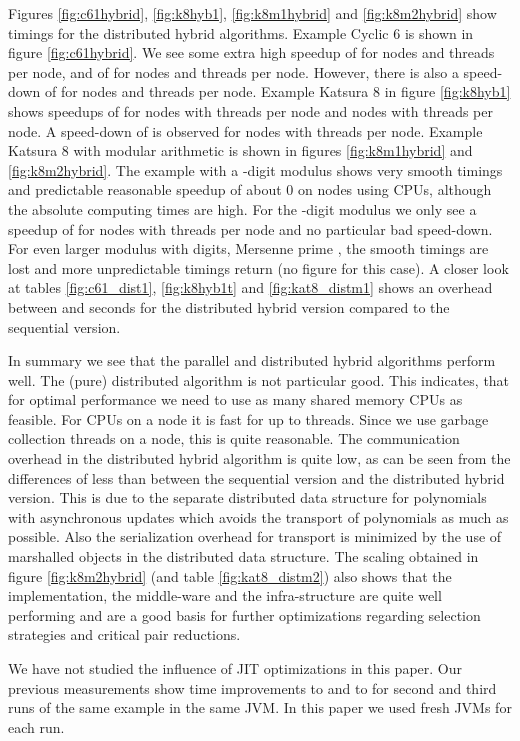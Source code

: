 \documentclass[10pt,twocolumn,a4paper]{article}
\begin{document}
Figures \ref{fig:c61hybrid}, \ref{fig:k8hyb1}, \ref{fig:k8m1hybrid}
and \ref{fig:k8m2hybrid} show timings for the distributed hybrid
algorithms.  Example Cyclic 6 is shown in figure \ref{fig:c61hybrid}.
We see some extra high speedup of  for  nodes and  threads
per node, and of  for  nodes and  threads per node. However,
there is also a speed-down of  for  nodes and  threads per
node.  Example Katsura 8 in figure \ref{fig:k8hyb1} shows speedups of
 for  nodes with  threads per node and  nodes with 
threads per node.  A speed-down of  is observed for  nodes
with  threads per node.  Example Katsura 8 with modular arithmetic
is shown in figures \ref{fig:k8m1hybrid} and \ref{fig:k8m2hybrid}.
The example with a -digit modulus shows very smooth timings and
predictable reasonable speedup of about 0 on  nodes using 
CPUs, although the absolute computing times are high.  For the
-digit modulus we only see a speedup of  for  nodes with 
threads per node and no particular bad speed-down. For even larger
modulus with  digits, Mersenne prime , the smooth
timings are lost and more unpredictable timings return (no figure for
this case).  A closer look at tables \ref{fig:c61_dist1},
\ref{fig:k8hyb1t} and \ref{fig:kat8_distm1} shows an overhead between  and  seconds for the distributed
hybrid version compared to the sequential version.

In summary we see that the parallel and distributed hybrid algorithms
perform well. The (pure) distributed algorithm is not particular good.
This indicates, that for optimal performance we need to use as many
shared memory CPUs as feasible. For  CPUs on a node it is fast for
up to  threads. Since we use  garbage collection threads on a
node, this is quite reasonable. The communication overhead in the
distributed hybrid algorithm is quite low, as can be seen from the
differences of less than  between the sequential version and the
distributed hybrid version. This is due to the separate distributed
data structure for polynomials with asynchronous updates which avoids
the transport of polynomials as much as possible. Also the
serialization overhead for transport is minimized by the use of
marshalled objects in the distributed data structure. The scaling
obtained in figure \ref{fig:k8m2hybrid} (and table
\ref{fig:kat8_distm2}) also shows that the implementation, the
middle-ware and the infra-structure are quite well performing and are
a good basis for further optimizations regarding selection strategies
and critical pair reductions.

We have not studied the influence of JIT optimizations in this paper.
Our previous measurements \cite{Kredel:2008a,Kredel:2008b,Kredel:2009a} 
show time improvements to  and to  for
second and third runs of the same example in the same JVM. In this
paper we used fresh JVMs for each run.
\end{document}
